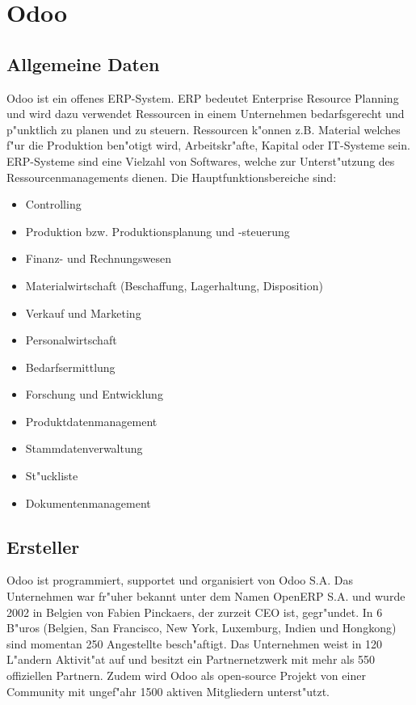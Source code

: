 \section{Odoo}

\subsection{Allgemeine Daten}
Odoo ist ein offenes ERP-System. ERP bedeutet Enterprise Resource Planning und wird dazu verwendet Ressourcen in einem Unternehmen bedarfsgerecht und p"unktlich zu planen und zu steuern. Ressourcen k"onnen z.B. Material welches f"ur die Produktion ben"otigt wird, Arbeitskr"afte, Kapital oder IT-Systeme sein. ERP-Systeme sind eine Vielzahl von Softwares, welche zur Unterst"utzung des Ressourcenmanagements dienen. Die Hauptfunktionsbereiche sind:
\begin{itemize}
	\item Controlling
	\item Produktion bzw. Produktionsplanung und -steuerung
	\item Finanz- und Rechnungswesen
	\item Materialwirtschaft (Beschaffung, Lagerhaltung, Disposition)
	\item Verkauf und Marketing
	\item Personalwirtschaft
	\item Bedarfsermittlung
	\item Forschung und Entwicklung
	\item Produktdatenmanagement
	\item Stammdatenverwaltung
	\item St"uckliste
	\item Dokumentenmanagement
\end{itemize}


\subsection{Ersteller}
Odoo ist programmiert, supportet und organisiert von Odoo S.A. Das Unternehmen war fr"uher bekannt unter dem Namen OpenERP S.A. und wurde 2002 in Belgien von Fabien Pinckaers, der zurzeit CEO ist, gegr"undet. In 6 B"uros (Belgien, San Francisco, New York, Luxemburg, Indien und Hongkong) sind momentan 250 Angestellte besch"aftigt. Das Unternehmen weist in 120 L"andern Aktivit"at auf und besitzt ein Partnernetzwerk mit mehr als 550 offiziellen Partnern. Zudem wird Odoo als open-source Projekt von einer Community mit ungef"ahr 1500 aktiven Mitgliedern unterst"utzt.

